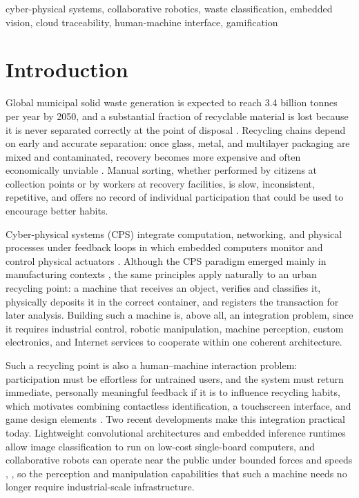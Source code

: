 \documentclass[conference]{IEEEtran}
\begin{document}
\begin{IEEEkeywords}
cyber-physical systems, collaborative robotics, waste classification, embedded vision, cloud traceability, human-machine interface, gamification
\end{IEEEkeywords}

\section{Introduction}
Global municipal solid waste generation is expected to reach 3.4 billion tonnes per year by 2050, and a substantial fraction of recyclable material is lost because it is never separated correctly at the point of disposal \cite{b1}. Recycling chains depend on early and accurate separation: once glass, metal, and multilayer packaging are mixed and contaminated, recovery becomes more expensive and often economically unviable \cite{b1}. Manual sorting, whether performed by citizens at collection points or by workers at recovery facilities, is slow, inconsistent, repetitive, and offers no record of individual participation that could be used to encourage better habits.

Cyber-physical systems (CPS) integrate computation, networking, and physical processes under feedback loops in which embedded computers monitor and control physical actuators \cite{b2}. Although the CPS paradigm emerged mainly in manufacturing contexts \cite{b3}, the same principles apply naturally to an urban recycling point: a machine that receives an object, verifies and classifies it, physically deposits it in the correct container, and registers the transaction for later analysis. Building such a machine is, above all, an integration problem, since it requires industrial control, robotic manipulation, machine perception, custom electronics, and Internet services to cooperate within one coherent architecture.

Such a recycling point is also a human--machine interaction problem: participation must be effortless for untrained users, and the system must return immediate, personally meaningful feedback if it is to influence recycling habits, which motivates combining contactless identification, a touchscreen interface, and game design elements \cite{b12}. Two recent developments make this integration practical today. Lightweight convolutional architectures \cite{b7} and embedded inference runtimes \cite{b9} allow image classification to run on low-cost single-board computers, and collaborative robots can operate near the public under bounded forces and speeds \cite{b10}, \cite{b11}, so the perception and manipulation capabilities that such a machine needs no longer require industrial-scale infrastructure.
\end{document}
